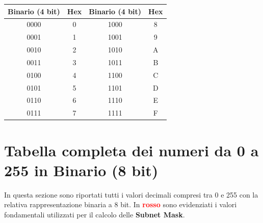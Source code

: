 \documentclass[a4paper,12pt]{report}
\renewcommand{\arraystretch}{1.2} %
\begin{document}
\begin{center}
\renewcommand{\arraystretch}{1.2}
\setlength{\tabcolsep}{8pt}
\begin{tabular}{|c|c||c|c|}
\hline
\textbf{Binario (4 bit)} & \textbf{Hex} & \textbf{Binario (4 bit)} & \textbf{Hex} \\
\hline
0000 & 0 & 1000 & 8 \\
0001 & 1 & 1001 & 9 \\
0010 & 2 & 1010 & A \\
0011 & 3 & 1011 & B \\
0100 & 4 & 1100 & C \\
0101 & 5 & 1101 & D \\
0110 & 6 & 1110 & E \\
0111 & 7 & 1111 & F \\
\hline
\end{tabular}
\end{center}


\newpage
\section{Tabella completa dei numeri da 0 a 255 in Binario (8 bit)}

In questa sezione sono riportati tutti i valori decimali compresi tra 0 e 255 con la relativa rappresentazione binaria a 8 bit. In \textbf{\textcolor{red}{rosso}} sono evidenziati i valori fondamentali utilizzati per il calcolo delle \textbf{Subnet Mask}.
\end{document}

